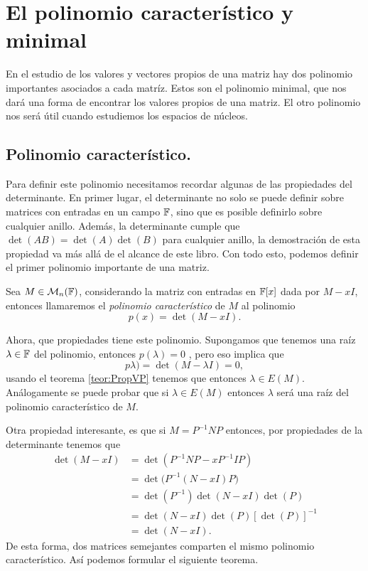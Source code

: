 \section{El polinomio característico y minimal}

En el estudio de los valores y vectores propios de una matriz hay dos polinomio importantes asociados a cada matríz. Estos son el polinomio minimal, que nos dará una forma de encontrar los valores propios de una matriz. El otro polinomio nos será útil cuando estudiemos los espacios de núcleos.

\subsection{Polinomio característico.}

Para definir este polinomio necesitamos recordar algunas de las propiedades del determinante. En primer lugar, el determinante no solo se puede definir sobre matrices con entradas en un campo $\mathbb{F}$, sino que es posible definirlo sobre cualquier anillo. Además, la determinante cumple que $\det(AB) = \det(A)\det(B)$ para cualquier anillo, la demostración de esta propiedad va más allá de el alcance de este libro. Con todo esto, podemos definir el primer polinomio importante de una matriz.

\begin{defi}
  Sea $M \in \mathcal{M}_n(\mathbb{F})$, considerando la matriz con entradas en $\mathbb{F}[x]$ dada por $M-xI$, entonces llamaremos el \emph{polinomio característico} de $M$ al polinomio
    \[ p(x) = \det(M-xI). \]
\end{defi}

Ahora, que propiedades tiene este polinomio. Supongamos que tenemos una raíz $\lambda \in \mathbb{F}$ del polinomio, entonces $p(\lambda) = 0$ , pero eso implica que
\[ p\lambda) = \det(M-\lambda I) = 0, \]
usando el teorema \ref{teor:PropVP} tenemos que entonces $\lambda \in E(M)$. Análogamente se puede probar que si $\lambda \in E(M)$ entonces $\lambda$ será una raíz del polinomio característico de $M$.

Otra propiedad interesante, es que si $M = P^{-1} N P$ entonces, por propiedades de la determinante tenemos que
\begin{align*}
  \det(M - xI) &= \det(P^{-1}NP - x P^{-1}IP) \\
    &= \det\bigl(P^{-1}(N- xI)P\bigr) \\
    &= \det(P^{-1})\det(N - xI) \det(P) \\
    &= \det(N - xI) \det(P) [\det(P)]^{-1} \\
    &= \det(N - xI).
\end{align*}
De esta forma, dos matrices semejantes comparten el mismo polinomio característico. Así podemos formular el siguiente teorema.

